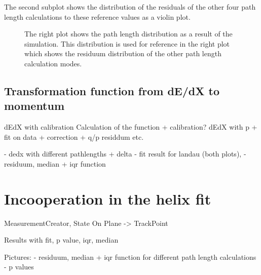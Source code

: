 The second subplot shows the distribution of the residuals of the other four path length calculations to these reference values as a violin plot.


\begin{figure}
 \centering
 \caption{The right plot shows the path length distribution as a result of the simulation. This distribution is used for reference in the right plot which shows the residuum distribution of the other path length calculation modes.}
\end{figure}


\subsection{Transformation function from dE/dX to momentum}


dEdX with calibration
Calculation of the function + calibration?
dEdX with p + fit on data + correction + q/p residdum etc.

- dedx with different pathlengths + delta
- fit result for landau (both plots),
- residuum, median + iqr function

\section{Incooperation in the helix fit}

MeasurementCreator, State On Plane -> TrackPoint

Results with fit, p value, iqr, median

Pictures:
- residuum, median + iqr function for different path length calculations
- p values